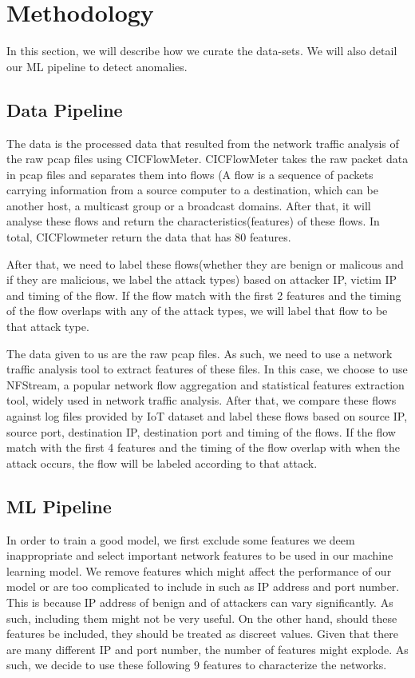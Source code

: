 \section{Methodology}
\label{sec:method}
\begin{method}
In this section, we will describe how we curate the data-sets. We will also detail our ML pipeline to detect anomalies.
\subsection{Data Pipeline}
 The data is the processed data that resulted from the network traffic analysis of the raw pcap files using CICFlowMeter. CICFlowMeter takes the raw packet data in pcap files  and separates them into flows (A flow is a sequence of packets carrying information from a source computer to a destination, which can be another host, a multicast group or a broadcast domains. After that, it will analyse these flows and return the characteristics(features) of these flows. In total, CICFlowmeter return the data that has 80 features.

After that, we need to label these flows(whether they are benign or malicous and if they are malicious, we label the attack types) based on attacker IP, victim IP and timing of the flow. If the flow match with the first 2 features and the timing of the flow overlaps with any of the attack types, we will label that flow to be that attack type. 

The data given to us are the raw pcap files. As such, we need to use a network traffic analysis tool to extract features of these files. In this case, we choose to use NFStream, a popular network flow aggregation and statistical features extraction tool, widely used in network traffic analysis. After that, we compare these flows against log files provided by IoT dataset and label these flows based on source IP, source port, destination IP, destination port and timing of the flows. If the flow match with the first 4 features and the timing of the flow overlap with when the attack occurs, the flow will be labeled according to that attack.

\subsection{ML Pipeline}
 In order to train a good model, we first exclude some features we deem inappropriate and select important network features to be used in our machine learning model. We remove features which might affect the performance of our model or are too complicated to include in such as IP address and port number. This is because IP address of benign and of attackers can vary significantly. As such, including them might not be very useful. On the other hand, should these features be included, they should be treated as discreet values. Given that there are many different IP and port number, the number of features might explode. As such, we decide to use these following 9 features to characterize the networks.


\end{method}
